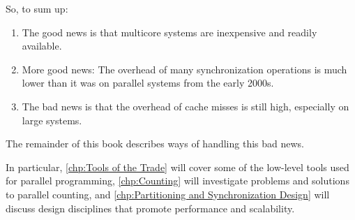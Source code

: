 So, to sum up:

\begin{enumerate}
\item	The good news is that multicore systems are inexpensive and
	readily available.
\item	More good news:
	The overhead of many synchronization operations is much lower
	than it was on parallel systems from the early 2000s.
\item	The bad news is that the overhead of cache misses is still high,
	especially on large systems.
\end{enumerate}

The remainder of this book describes ways of handling this bad news.

In particular,
\cref{chp:Tools of the Trade} will cover some of the low-level
tools used for parallel programming,
\cref{chp:Counting} will investigate problems and solutions to
parallel counting, and
\cref{chp:Partitioning and Synchronization Design}
will discuss design disciplines that promote performance and scalability.

